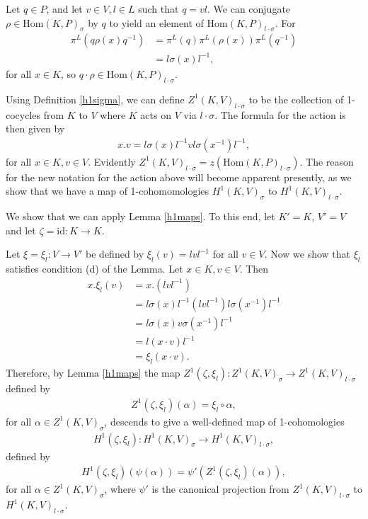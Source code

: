 Let $q \in P$, and let $v \in V, l \in L$ such that $q = vl$. We can conjugate $\rho \in \mathrm{Hom}(K, P)_\sigma$ by $q$ to yield an element of $\mathrm{Hom}(K, P)_{l \cdot \sigma}$. For
\begin{align*}%
\pi^L\left(q \rho(x) q^{-1}\right)%
&= \pi^L\left(q\right) \pi^L\left(\rho(x)\right) \pi^L\left(q^{-1}\right) \\
&= l \sigma(x) l^{-1},
\end{align*}
for all $x \in K$, so $q \cdot \rho \in \mathrm{Hom}(K, P)_{l\cdot \sigma}$.

Using Definition \ref{h1sigma}, we can define $Z^1(K, V)_{l \cdot \sigma}$ to be the collection of 1-cocycles from $K$ to $V$ where $K$ acts on $V$ via $l \cdot \sigma$. The formula for the action is then given by
\begin{align*}
	x.v = l \sigma(x) l^{-1} v l \sigma(x^{-1}) l^{-1},
\end{align*}
for all $x \in K, v \in V$. Evidently $Z^1(K, V)_{l \cdot \sigma} = z\left(\mathrm{Hom}(K, P)_{l \cdot \sigma}\right)$. The reason for the new notation for the action above will become apparent presently, as we show that we have a map of 1-cohomomologies $H^1(K, V)_\sigma$ to $H^1(K, V)_{l \cdot \sigma}$.

	We show that we can apply Lemma \ref{h1maps}. To this end, let $K' = K$, $V' = V$ and let $\zeta = \mathrm{id}:K \rightarrow K$.

Let $\xi = \xi_l: V \rightarrow V'$ be defined by	$\xi_l(v) = lvl^{-1}$ for all $v \in V$. Now we show that $\xi_l$ satisfies condition (d) of the Lemma. Let $x \in K, v \in V$. Then
	\begin{align*}
		x . \xi_l(v) &= x . \left(lvl^{-1}\right) \\
		&= l\sigma(x)l^{-1} \left(lvl^{-1}\right) l\sigma(x^{-1})l^{-1} \\
		&= l\sigma(x)v\sigma(x^{-1})l^{-1} \\
		&= l\left(x \cdot v \right)l^{-1} \\
		&= \xi_l \left(x \cdot v \right).
	\end{align*}
	Therefore, by Lemma \ref{h1maps} the map $Z^1(\zeta, \xi_l):Z^1(K, V)_\sigma \rightarrow Z^1(K, V)_{l \cdot \sigma}$ defined by 
	\begin{align*}
		Z^1(\zeta, \xi_l)(\alpha) = \xi_l \circ \alpha,
	\end{align*}
	for all $\alpha \in Z^1(K, V)_\sigma$,
	descends to give a well-defined map of 1-cohomologies
	\begin{align*}
		H^1(\zeta, \xi_l):H^1(K, V)_\sigma \rightarrow H^1(K, V)_{l \cdot \sigma},
	\end{align*}
	defined by
	\begin{align*}
		H^1(\zeta, \xi_l)\left(\psi(\alpha)\right) = \psi'\left(Z^1(\zeta, \xi_l)(\alpha)\right),
	\end{align*}
	for all $\alpha \in Z^1(K, V)_\sigma$,
	where $\psi'$ is the canonical projection from $Z^1(K, V)_{l \cdot \sigma}$ to $H^1(K, V)_{l \cdot \sigma}$.

